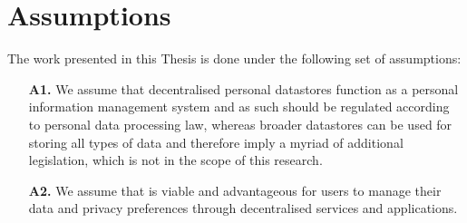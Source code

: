 \section{Assumptions}
\label{sec:assumptions}

The work presented in this Thesis is done under the following set of assumptions:

\begin{enumerate}
    \item [\textbf{A1.}] We assume that decentralised personal datastores function as a personal information management system and as such should be regulated according to personal data processing law, whereas broader datastores can be used for storing all types of data and therefore imply a myriad of additional legislation, which is not in the scope of this research. 
    \item [\textbf{A2.}] We assume that is viable and advantageous for users to manage their data and privacy preferences through decentralised services and applications.
\end{enumerate}
